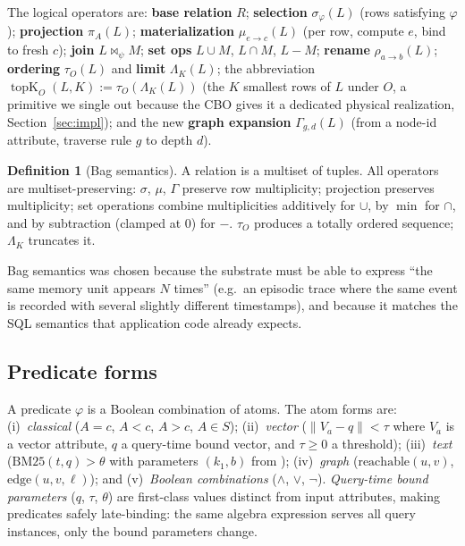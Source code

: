 \documentclass[acmsmall,review,anonymous]{acmart}
\theoremstyle{plain}
\theoremstyle{definition}
\newtheorem{definition}{Definition}
\newcommand{\topK}{\operatorname{topK}}
\theoremstyle{remark}
\begin{document}
The logical operators are: \textbf{base relation} $R$;
\textbf{selection} $\sigma_\varphi(L)$ (rows satisfying $\varphi$);
\textbf{projection} $\pi_A(L)$; \textbf{materialization}
$\mu_{e\to c}(L)$ (per row, compute $e$, bind to fresh $c$);
\textbf{join} $L \bowtie_\psi M$; \textbf{set ops} $L \cup M$,
$L \cap M$, $L - M$; \textbf{rename} $\rho_{a\to b}(L)$;
\textbf{ordering} $\tau_O(L)$ and \textbf{limit} $\Lambda_K(L)$;
the abbreviation $\topK_O(L, K) := \tau_O(\Lambda_K(L))$
(the $K$ smallest rows of $L$ under $O$, a primitive we
single out because the CBO gives it a dedicated physical
realization, Section~\ref{sec:impl}); and the new
\textbf{graph expansion} $\Gamma_{g,d}(L)$ (from a node-id
attribute, traverse rule $g$ to depth $d$).

\begin{definition}[Bag semantics]\label{def:bag}
A relation is a multiset of tuples. All operators are
multiset-preserving: $\sigma$, $\mu$, $\Gamma$ preserve row
multiplicity; projection preserves multiplicity; set operations
combine multiplicities additively for $\cup$, by $\min$ for $\cap$,
and by subtraction (clamped at $0$) for $-$. $\tau_O$ produces a
totally ordered sequence; $\Lambda_K$ truncates it.
\end{definition}

Bag semantics was chosen because the substrate must be able to
express ``the same memory unit appears $N$ times'' (e.g.\ an
episodic trace where the same event is recorded with several
slightly different timestamps), and because it matches the SQL
semantics that application code already expects.

\subsection{Predicate forms}

A predicate $\varphi$ is a Boolean combination of atoms. The atom
forms are: (i)~\emph{classical} ($A = c$, $A < c$, $A > c$, $A \in
S$); (ii)~\emph{vector} ($\lVert V_a - q \rVert < \tau$ where
$V_a$ is a vector attribute, $q$ a query-time bound vector, and
$\tau \geq 0$ a threshold); (iii)~\emph{text}
($\mathrm{BM25}(t, q) > \theta$ with parameters $(k_1, b)$ from
\cite{robertson1995}); (iv)~\emph{graph}
($\mathrm{reachable}(u, v)$, $\mathrm{edge}(u, v, \ell)$); and
(v)~\emph{Boolean combinations} ($\wedge$, $\vee$, $\neg$).
\emph{Query-time bound parameters} ($q$, $\tau$, $\theta$) are
first-class values distinct from input attributes, making predicates
safely late-binding: the same algebra expression serves all query
instances, only the bound parameters change.
\end{document}
